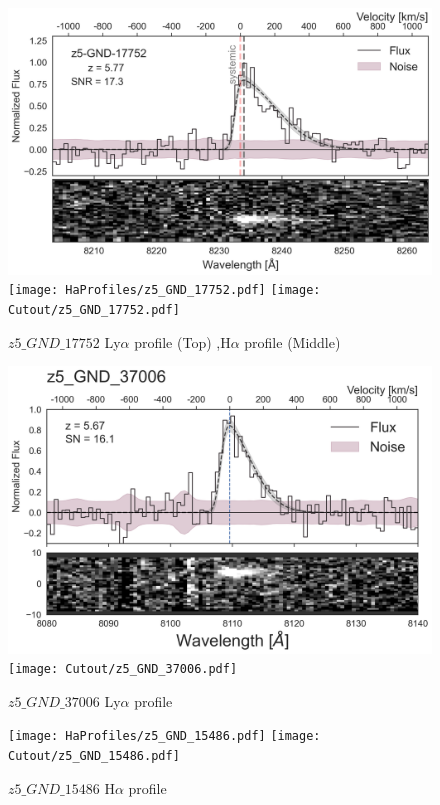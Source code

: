 \documentclass[12pt,english]{article}
\begin{document}
\begin{figure}
\begin{center}\includegraphics[width=12cm, trim=0.1cm 0cm 0cm -1cm]{LyaProfiles/z5_GND_17752.png}
\texttt{[image: HaProfiles/z5\_GND\_17752.pdf]}
\texttt{[image: Cutout/z5\_GND\_17752.pdf]}
\caption{$z5\_GND\_17752$ Ly$\alpha$ profile (Top) ,H$\alpha$ profile (Middle)}
\end{center}
\end{figure}
\clearpage
\begin{figure}
\begin{center}\includegraphics[width=12cm, trim=0.1cm 0cm 0cm -1cm]{LyaProfiles/z5_GND_37006.png}
\texttt{[image: Cutout/z5\_GND\_37006.pdf]}
\caption{$z5\_GND\_37006$ Ly$\alpha$ profile}
\end{center}
\end{figure}
\clearpage
\begin{figure}
\begin{center}\texttt{[image: HaProfiles/z5\_GND\_15486.pdf]}
\texttt{[image: Cutout/z5\_GND\_15486.pdf]}
\caption{$z5\_GND\_15486$ H$\alpha$ profile}
\end{center}
\end{figure}
\end{document}

